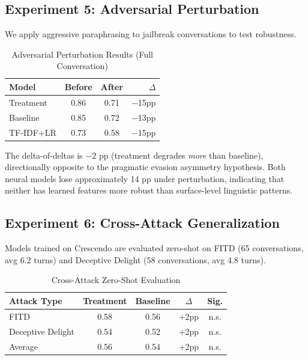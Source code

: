 \documentclass[11pt]{article}
\begin{document}
\subsection{Experiment 5: Adversarial Perturbation}

We apply aggressive paraphrasing to jailbreak conversations to test robustness.

\begin{table}[h]
\centering
\caption{Adversarial Perturbation Results (Full Conversation)}
\label{tab:adversarial}
\begin{tabular}{lccr}
\toprule
\textbf{Model} & \textbf{Before} & \textbf{After} & \textbf{$\Delta$} \\
\midrule
Treatment & 0.86 & 0.71 & $-$15pp \\
Baseline & 0.85 & 0.72 & $-$13pp \\
TF-IDF+LR & 0.73 & 0.58 & $-$15pp \\
\bottomrule
\end{tabular}
\end{table}

The delta-of-deltas is $-2$ pp (treatment degrades \emph{more} than baseline), directionally opposite to the pragmatic evasion asymmetry hypothesis. Both neural models lose approximately 14 pp under perturbation, indicating that neither has learned features more robust than surface-level linguistic patterns.

\subsection{Experiment 6: Cross-Attack Generalization}

Models trained on Crescendo are evaluated zero-shot on FITD (65 conversations, avg 6.2 turns) and Deceptive Delight (58 conversations, avg 4.8 turns).

\begin{table}[h]
\centering
\caption{Cross-Attack Zero-Shot Evaluation}
\label{tab:cross}
\begin{tabular}{lcccc}
\toprule
\textbf{Attack Type} & \textbf{Treatment} & \textbf{Baseline} & \textbf{$\Delta$} & \textbf{Sig.} \\
\midrule
FITD & 0.58 & 0.56 & +2pp & n.s. \\
Deceptive Delight & 0.54 & 0.52 & +2pp & n.s. \\
Average & 0.56 & 0.54 & +2pp & n.s. \\
\bottomrule
\end{tabular}
\end{table}
\end{document}
